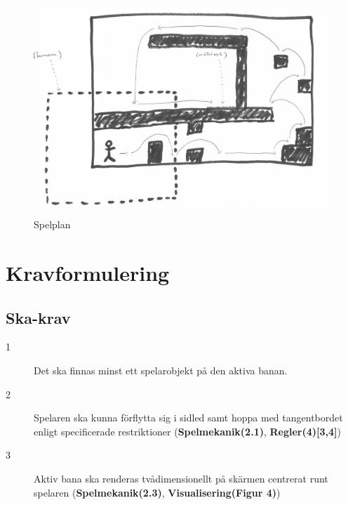 \documentclass{TDP003mall}
\begin{document}
\begin{figure}[!h]
  \centering
  \includegraphics[scale=0.20]{spelplan}
  \caption{Spelplan}
  \label{Spelplan}
\end{figure}

\section{Kravformulering}
\subsection{Ska-krav}
\begin{description}
\item[1] Det ska finnas minst ett spelarobjekt på den aktiva banan.
\item[2] Spelaren ska kunna förflytta sig i sidled samt hoppa med tangentbordet enligt specificerade restriktioner (\textbf{Spelmekanik(2.1)}, \textbf{Regler(4)[3,4]})
\item[3] Aktiv bana ska renderas tvådimensionellt på skärmen centrerat runt spelaren (\textbf{Spelmekanik(2.3)}, \textbf{Visualisering(Figur 4)})
\end{description}
\end{document}

